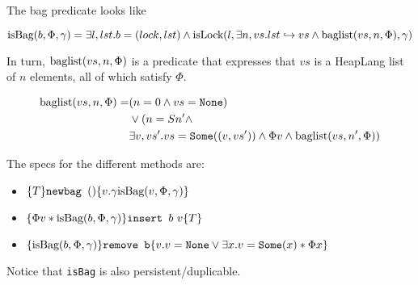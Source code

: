 The bag predicate looks like

\[ \text{isBag}{(b, \Phi, \gamma)}  = \exists l, lst. b = (lock, lst) \land \text{isLock}{(l, \exists n, vs. lst \hookrightarrow vs \land \text{baglist}(vs, n, \Phi), \gamma)}  \]

In turn, $\text{baglist}(vs, n, \Phi)$ is a predicate that expresses that $vs$ is a HeapLang list of $n$ elements, all of which satisfy $\Phi$.

\begin{align*}
\text{baglist}(vs, n, \Phi) =& (n = 0 \land vs = \texttt{None}) \\
& \lor (n = S n' \land \\
& \exists v, vs'. vs = \texttt{Some}((v, vs')) \land \Phi v \land \text{baglist}(vs, n', \Phi) ) 
\end{align*}


The specs for the different methods are:
\begin{itemize}

\item $\{T\} \texttt{newbag } () \{v. \gamma \text{isBag}{(v, \Phi, \gamma)}\}$

\item $\{\Phi v * \text{isBag}{(b, \Phi, \gamma)}\} \texttt{insert } b \text{ } v \{T\}$

\item $\{\text{isBag}{(b, \Phi, \gamma)}\} \texttt{remove b} \{v. v = \texttt{None} \lor \exists x. v = \texttt{Some}(x) * \Phi x\}$

\end{itemize}

Notice that \texttt{isBag} is also persistent/duplicable.

